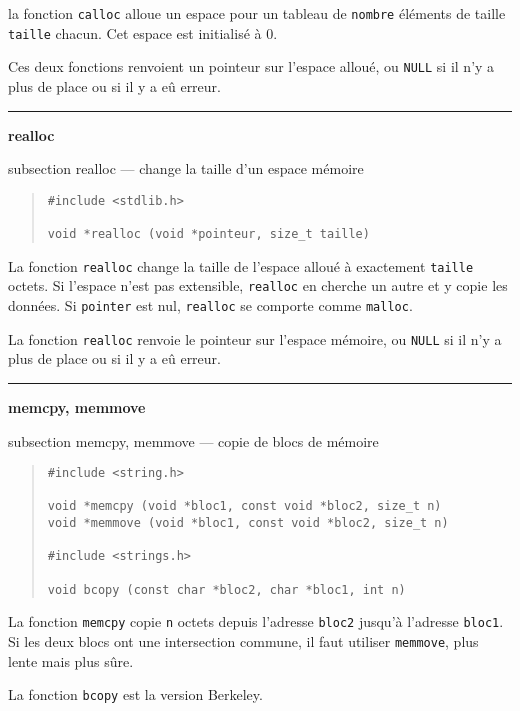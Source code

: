 \documentclass [twoside] {report}
\newcommand {\primitive} [1]
    {
	\phantomsection
	{\large \textbf {#1}}
	\addcontentsline {toc} {subsection} {#1}
    }
\newcommand {\separation}
    {
	\vspace {5mm}
	\nopagebreak
	\hrule
    }
\begin{document}
la fonction \texttt {calloc} alloue un espace pour un tableau de
\texttt {nombre} éléments de taille \texttt {taille} chacun. Cet espace
est initialisé à 0.

Ces deux fonctions renvoient un pointeur sur l'espace
alloué, ou \texttt{NULL} si il n'y a plus de place ou si il y a eû
erreur.


\separation
\primitive {realloc} --- change la taille d'un espace mémoire

\begin {quote}
\begin {verbatim}
#include <stdlib.h>

void *realloc (void *pointeur, size_t taille)
\end{verbatim}
\end {quote}

La fonction \texttt {realloc} change la taille de l'espace alloué
à exactement \texttt {taille} octets. Si l'espace n'est pas
extensible, \texttt {realloc} en cherche un autre et y copie les
données. Si \texttt{pointer} est nul, \texttt{realloc} se comporte
comme \texttt{malloc}.

La fonction \texttt {realloc} renvoie le pointeur sur l'espace
mémoire, ou \texttt{NULL} si il n'y a plus de place ou si il y a eû
erreur.





\separation
\primitive {memcpy, memmove} --- copie de blocs de mémoire

\begin {quote}
\begin {verbatim}
#include <string.h>

void *memcpy (void *bloc1, const void *bloc2, size_t n)
void *memmove (void *bloc1, const void *bloc2, size_t n)

#include <strings.h>

void bcopy (const char *bloc2, char *bloc1, int n)
\end{verbatim}
\end {quote}

La fonction \texttt {memcpy} copie \texttt {n} octets depuis l'adresse
\texttt {bloc2} jusqu'à l'adresse \texttt {bloc1}. Si les deux blocs ont une
intersection commune, il faut utiliser \texttt {memmove}, plus lente mais
plus sûre.

La fonction \texttt {bcopy} est la version Berkeley.
\end{document}

